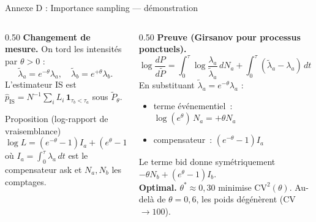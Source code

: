 \documentclass[10pt,aspectratio=169]{beamer}
\begin{document}
\begin{frame}{Annexe D : Importance sampling --- démonstration}
\begin{columns}[T]
\begin{column}{0.50\textwidth}
\small
\textbf{Changement de mesure.} On tord les intensités par $\theta>0$ :
\[
\tilde\lambda_a=e^{-\theta}\lambda_a,\quad
\tilde\lambda_b=e^{+\theta}\lambda_b.
\]
L'estimateur IS est $\hat p_\mathrm{IS}=N^{-1}\sum_i L_i\,\mathbf{1}_{\tau_b<\tau_a}$ sous $\tilde P_\theta$.

\begin{block}{Proposition (log-rapport de vraisemblance)}
\small
\[
\log L = (e^{-\theta}-1)I_a+(e^{\theta}-1)I_b+\theta N_a-\theta N_b,
\]
où $I_a=\int_0^\tau\!\lambda_a\,dt$ est le compensateur ask et $N_a,N_b$ les comptages.
\end{block}
\end{column}
\begin{column}{0.50\textwidth}
\small
\textbf{Preuve (Girsanov pour processus ponctuels).}
\[
\log\frac{dP}{d\tilde P}=
\int_0^\tau\!\log\frac{\lambda_a}{\tilde\lambda_a}\,dN_a
+\int_0^\tau\!(\tilde\lambda_a-\lambda_a)\,dt+\text{bid}.
\]
En substituant $\tilde\lambda_a=e^{-\theta}\lambda_a$ :
\begin{itemize}\small
  \item terme événementiel~: $\log(e^\theta)\,N_a = +\theta N_a$
  \item compensateur~: $(e^{-\theta}-1)I_a$
\end{itemize}
Le terme bid donne symétriquement $-\theta N_b+(e^\theta-1)I_b$.\\[0.5ex]
\textbf{Optimal.} $\theta^*\approx0{,}30$ minimise $\mathrm{CV}^2(\theta)$. Au-delà de $\theta=0{,}6$, les poids dégénèrent (CV$\to100$).
\end{column}
\end{columns}
\end{frame}
\end{document}
